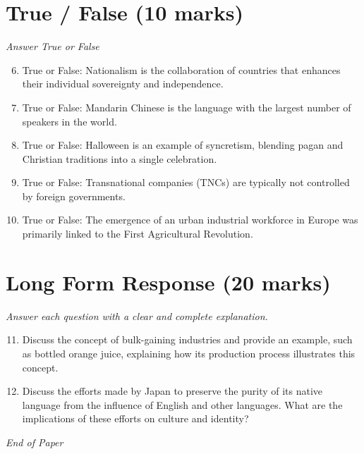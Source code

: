 \documentclass[12pt]{article}
\begin{document}
\section*{True / False (10 marks)}
\textit{Answer True or False}
\begin{enumerate}[label=\arabic*.]
\setcounter{enumi}{5}
\item True or False: Nationalism is the collaboration of countries that enhances their individual sovereignty and independence.
\item True or False: Mandarin Chinese is the language with the largest number of speakers in the world.
\item True or False: Halloween is an example of syncretism, blending pagan and Christian traditions into a single celebration.
\item True or False: Transnational companies (TNCs) are typically not controlled by foreign governments.
\item True or False: The emergence of an urban industrial workforce in Europe was primarily linked to the First Agricultural Revolution.
\end{enumerate}

\section*{Long Form Response (20 marks)}
\textit{Answer each question with a clear and complete explanation.}
\begin{enumerate}[label=\arabic*.]
\setcounter{enumi}{10}
\item Discuss the concept of bulk-gaining industries and provide an example, such as bottled orange juice, explaining how its production process illustrates this concept.
\item Discuss the efforts made by Japan to preserve the purity of its native language from the influence of English and other languages. What are the implications of these efforts on culture and identity?
\end{enumerate}

\vfill
\noindent\textit{End of Paper}
\end{document}
